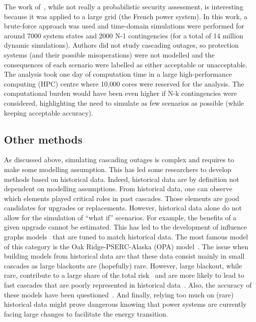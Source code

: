 The work of~\cite{EurostagHPC}, while not really a probabilistic security assessment, is interesting because it was applied to a large grid (the French power system). In this work, a brute-force approach was used and time-domain simulations were performed for around 7000 system states and 2000 N-1 contingencies (for a total of 14 million dynamic simulations). Authors did not study cascading outages, so protection systems (and their possible misoperations) were not modelled and the consequences of each scenario were labelled as either acceptable or unacceptable. The analysis took one day of computation time in a large high-performance computing (HPC) centre where 10,000 cores were reserved for the analysis. The computational burden would have been even higher if N-k contingencies were considered, highlighting the need to simulate as few scenarios as possible (while keeping acceptable accuracy).



\subsection{Other methods}
\label{sec:OtherMethods}

As discussed above, simulating cascading outages is complex and requires to make some modelling assumption. This has led some researchers to develop methods based on historical data. Indeed, historical data are by definition not dependent on modelling assumptions. From historical data, one can observe which elements played critical roles in past cascades. Those elements are good candidates for upgrades or replacements. However, historical data alone do not allow for the simulation of ``what if'' scenarios. For example, the benefits of a given upgrade cannot be estimated. This has led to the development of influence graphs models~\cite{CascadingInfluenceGraph} that are tuned to match historical data. The most famous model of this category is the Oak Ridge-PSERC-Alaska (OPA) model~\cite{OPA2019}. The issue when building models from historical data are that these data consist mainly in small cascades as large blackouts are (hopefully) rare. However, large blackout, while rare, contribute to a large share of the total risk~\cite{CascadingMethodoAndChallenges} and are more likely to lead to fast cascades that are poorly represented in historical data~\cite{cascadeAcceleration}. Also, the accuracy of these models have been questioned~\cite{TopologicalModelsBad}. And finally, relying too much on (rare) historical data might prove dangerous knowing that power systems are currently facing large changes to facilitate the energy transition.

